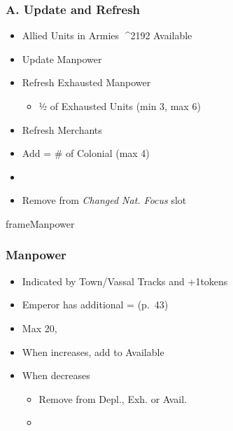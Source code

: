 \documentclass[10pt]{article}
\begin{document}
\subsubsection*{A. Update and Refresh}
\begin{itemize}
	\item Allied Units in Armies ^^^^2192 Available \manpower
	\item {}Update Manpower
	\item Refresh Exhausted Manpower
	\begin{itemize}
		\item ½ of Exhausted Units (min 3, max 6)
	\end{itemize}
	\item Refresh Merchants
	\item Add \colonists = \# of Colonial \claims (max 4)
	\item {}
	\item Remove \cube from \emph{Changed Nat. Focus} slot
\end{itemize}
\begin{dynamiccontents*}{frameManpower}
	\subsubsection*{Manpower }
	\begin{itemize}
		\item Indicated by Town/Vassal Tracks and +1\manpower tokens
		\item Emperor has additional \manpower = \authority (p.~43)
		\item Max 20, 
		\item When increases, add to Available \manpower
		\item When decreases
		\begin{itemize}
			\item Remove from Depl., Exh. or Avail. \manpower
			\item {}
		\end{itemize}
	\end{itemize}
\end{dynamiccontents*}
\end{document}
